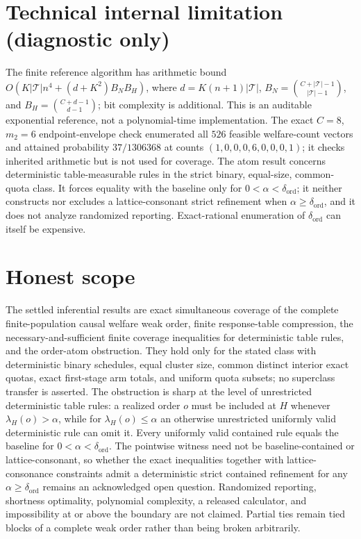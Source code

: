 \documentclass{article}
\begin{document}
\section*{Technical internal limitation (diagnostic only)}

The finite reference algorithm has arithmetic bound \(O(K|\mathcal T|n^4+(d+K^2)B_NB_H)\), where \(d=K(n+1)|\mathcal T|\), \(B_N=\binom{C+|\mathcal T|-1}{|\mathcal T|-1}\), and \(B_H=\binom{C+d-1}{d-1}\); bit complexity is additional. This is an auditable exponential reference, not a polynomial-time implementation. The exact \(C=8\), \(m_2=6\) endpoint-envelope check enumerated all \(526\) feasible welfare-count vectors and attained probability \(37/1306368\) at counts \((1,0,0,0,6,0,0,0,1)\); it checks inherited arithmetic but is not used for coverage. The atom result concerns deterministic table-measurable rules in the strict binary, equal-size, common-quota class. It forces equality with the baseline only for \(0<\alpha<\delta_{\mathrm{ord}}\); it neither constructs nor excludes a lattice-consonant strict refinement when \(\alpha\ge\delta_{\mathrm{ord}}\), and it does not analyze randomized reporting. Exact-rational enumeration of \(\delta_{\mathrm{ord}}\) can itself be expensive.

\section{Honest scope}

The settled inferential results are exact simultaneous coverage of the complete finite-population causal welfare weak order, finite response-table compression, the necessary-and-sufficient finite coverage inequalities for deterministic table rules, and the order-atom obstruction. They hold only for the stated class with deterministic binary schedules, equal cluster size, common distinct interior exact quotas, exact first-stage arm totals, and uniform quota subsets; no superclass transfer is asserted. The obstruction is sharp at the level of unrestricted deterministic table rules: a realized order \(o\) must be included at \(H\) whenever \(\lambda_H(o)>\alpha\), while for \(\lambda_H(o)\le\alpha\) an otherwise unrestricted uniformly valid deterministic rule can omit it. Every uniformly valid contained rule equals the baseline for \(0<\alpha<\delta_{\mathrm{ord}}\). The pointwise witness need not be baseline-contained or lattice-consonant, so whether the exact inequalities together with lattice-consonance constraints admit a deterministic strict contained refinement for any \(\alpha\ge\delta_{\mathrm{ord}}\) remains an acknowledged open question. Randomized reporting, shortness optimality, polynomial complexity, a released calculator, and impossibility at or above the boundary are not claimed. Partial ties remain tied blocks of a complete weak order rather than being broken arbitrarily.
\end{document}
